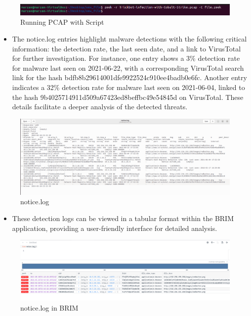 \begin{figure}[h!]
    \centering
    \includegraphics[width=1\linewidth]{images//file_malware/file_malware_1.png}
    \caption{Running PCAP with Script}
    \label{fig:enter-label}
\end{figure}

\begin{itemize}
    \item The notice.log entries highlight malware detections with the following critical information: the detection rate, the last seen date, and a link to VirusTotal for further investigation. For instance, one entry shows a 3\% detection rate for malware last seen on 2021-06-22, with a corresponding VirusTotal search link for the hash bdfb8b29614001dfe9922524c910ee4badb0e6fc. Another entry indicates a 32\% detection rate for malware last seen on 2021-06-04, linked to the hash 9b4025714911d509a67423ed8beffbc49e54845d on VirusTotal. These details facilitate a deeper analysis of the detected threats.
\end{itemize}
\begin{figure}[H]
    \centering
    \includegraphics[width=1\linewidth]{images//file_malware/file_malware_2.png}
    \caption{notice.log}
    \label{fig:enter-label}
\end{figure}

\begin{itemize}
    \item These detection logs can be viewed in a tabular format within the BRIM application, providing a user-friendly interface for detailed analysis.
\end{itemize}
\begin{figure}[H]
    \centering
    \includegraphics[width=1\linewidth]{images//UDP_reflection/file_malware_6.png}
    \caption{notice.log in BRIM}
    \label{fig:enter-label}
\end{figure}

